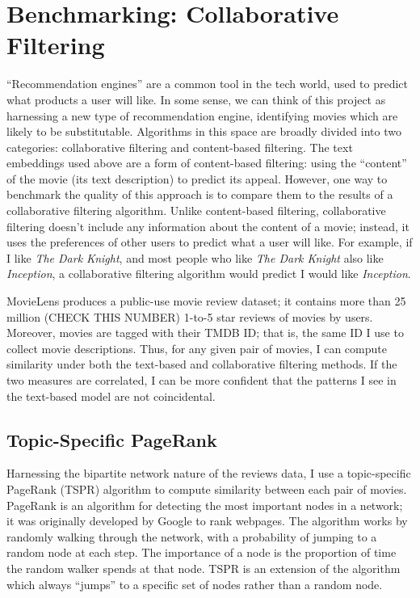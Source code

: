 \documentclass{article}
\begin{document}
\section{Benchmarking: Collaborative Filtering}

``Recommendation engines'' are a common tool in the tech world, used to predict what products a user will like. In some sense, we can think of this project as harnessing a new type of recommendation engine, identifying movies which are likely to be substitutable. Algorithms in this space are broadly divided into two categories: collaborative filtering and content-based filtering. The text embeddings used above are a form of content-based filtering: using the ``content'' of the movie (its text description) to predict its appeal. However, one way to benchmark the quality of this approach is to compare them to the results of a collaborative filtering algorithm. Unlike content-based filtering, collaborative filtering doesn't include any information about the content of a movie; instead, it uses the preferences of other users to predict what a user will like. For example, if I like \emph{The Dark Knight}, and most people who like \emph{The Dark Knight} also like \emph{Inception}, a collaborative filtering algorithm would predict I would like \emph{Inception}. 

MovieLens produces a public-use movie review dataset; it contains more than 25 million (CHECK THIS NUMBER) 1-to-5 star reviews of movies by users. Moreover, movies are tagged with their TMDB ID; that is, the same ID I use to collect movie descriptions. Thus, for any given pair of movies, I can compute similarity under both the text-based and collaborative filtering methods. If the two measures are correlated, I can be more confident that the patterns I see in the text-based model are not coincidental.

\subsection{Topic-Specific PageRank}

Harnessing the bipartite network nature of the reviews data, I use a topic-specific PageRank (TSPR) algorithm to compute similarity between each pair of movies. PageRank is an algorithm for detecting the most important nodes in a network; it was originally developed by Google to rank webpages. The algorithm works by randomly walking through the network, with a probability of jumping to a random node at each step. The importance of a node is the proportion of time the random walker spends at that node. TSPR is an extension of the algorithm which always ``jumps'' to a specific set of nodes rather than a random node.
\end{document}
